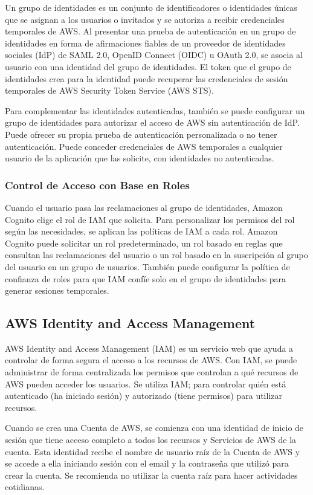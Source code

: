 \noindent Un grupo de identidades es un conjunto de identificadores o identidades únicas que se asignan a los usuarios o invitados y se autoriza a recibir credenciales temporales de AWS. Al presentar una prueba de autenticación en un grupo de identidades en forma de afirmaciones fiables de un proveedor de identidades sociales (IdP) de SAML 2.0, OpenID Connect (OIDC) u OAuth 2.0, se asocia al usuario con una identidad del grupo de identidades. El token que el grupo de identidades crea para la identidad puede recuperar las credenciales de sesión temporales de AWS Security Token Service (AWS STS).

Para complementar las identidades autenticadas, también se puede configurar un grupo de identidades para autorizar el acceso de AWS sin autenticación de IdP. Puede ofrecer su propia prueba de autenticación personalizada o no tener autenticación. Puede conceder credenciales de AWS temporales a cualquier usuario de la aplicación que las solicite, con identidades no autenticadas.

\subsubsection{Control de Acceso con Base en Roles}
Cuando el usuario pasa las reclamaciones al grupo de identidades, Amazon Cognito elige el rol de IAM que solicita. Para personalizar los permisos del rol según las necesidades, se aplican las políticas de IAM a cada rol. Amazon Cognito puede solicitar un rol predeterminado, un rol basado en reglas que consultan las reclamaciones del usuario o un rol basado en la suscripción al grupo del usuario en un grupo de usuarios. También puede configurar la política de confianza de roles para que IAM confíe solo en el grupo de identidades para generar sesiones temporales\cite{129}.


\subsection{AWS Identity and Access Management}

AWS Identity and Access Management (IAM) es un servicio web que ayuda a controlar de forma segura el acceso a los recursos de AWS. Con IAM, se puede administrar de forma centralizada los permisos que controlan a qué recursos de AWS pueden acceder los usuarios. Se utiliza IAM; para controlar quién está autenticado (ha iniciado sesión) y autorizado (tiene permisos) para utilizar recursos.

Cuando se crea una Cuenta de AWS, se comienza con una identidad de inicio de sesión que tiene acceso completo a todos los recursos y Servicios de AWS de la cuenta. Esta identidad recibe el nombre de usuario raíz de la Cuenta de AWS y se accede a ella iniciando sesión con el email y la contraseña que utilizó para crear la cuenta. Se recomienda no utilizar la cuenta raíz para hacer actividades cotidianas\cite{130}.

